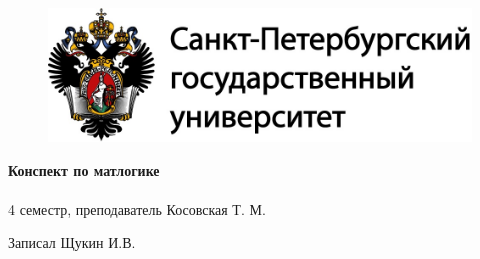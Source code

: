 \documentclass[main]{subfiles}
\begin{document}
	\begin{figure}[H]
			\includegraphics[width=12cm]{../../../template/spsu.jpg}
			\centering
	\end{figure}
	\vspace*{\fill}
	\begin{center}
		\huge \textbf{Конспект по матлогике}\\ \ \\
		\Large 4 семестр, преподаватель Косовская Т. М.

		\large Записал Щукин И.В.
	\end{center}
	\vspace*{\fill}
	\vspace*{\fill}

	\newpage
	\tableofcontents
	\newpage
\end{document}
